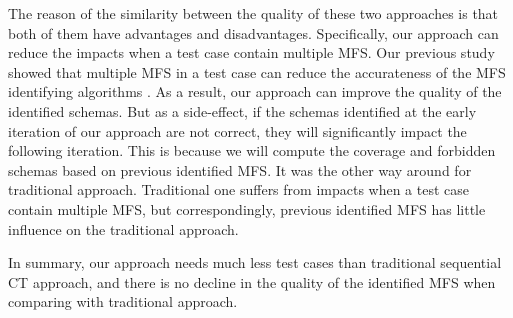 \documentclass{sig-alternate}
\begin{document}
The reason of the similarity between the quality of these two approaches is that both of them have advantages and disadvantages. Specifically, our approach can reduce the impacts when a test case contain multiple MFS. Our previous study showed that multiple MFS in a test case can reduce the accurateness of the MFS identifying algorithms \cite{niu2013identifying}. As a result, our approach can improve the quality of the identified schemas. But as a side-effect, if the schemas identified at the early iteration of our approach are not correct, they will significantly impact the following iteration. This is because we will compute the coverage and  forbidden schemas based on previous identified MFS.  It was the other way around for traditional approach. Traditional one suffers from impacts when a test case contain multiple MFS, but correspondingly, previous identified MFS has little influence on the traditional approach.


In summary, our approach needs much less test cases than traditional sequential CT approach, and there is no decline in the quality of the identified MFS when comparing with traditional approach.

%
%
%
\end{document}
